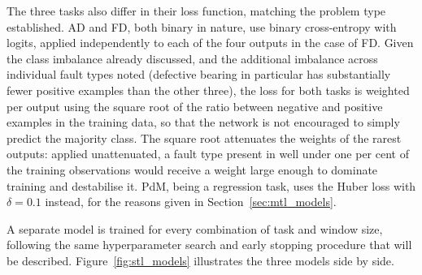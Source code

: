 The three tasks also differ in their loss function, matching the problem type established. AD and FD,
both binary in nature, use binary cross-entropy with logits, applied independently to each of the four
outputs in the case of FD. Given the class imbalance already discussed, and the additional imbalance
across individual fault types noted (defective bearing in particular has substantially fewer positive
examples than the other three), the loss for both tasks is weighted per output using the square root of
the ratio between negative and positive examples in the training data, so that the network is not
encouraged to simply predict the majority class. The square root attenuates the weights of the rarest
outputs: applied unattenuated, a fault type present in well under one per cent of the training
observations would receive a weight large enough to dominate training and destabilise it. PdM, being a
regression task, uses the Huber loss with $\delta = 0.1$ instead, for the reasons given in
Section~\ref{sec:mtl_models}.

A separate model is trained for every combination of task and window size, following the same hyperparameter 
search and early stopping procedure that will be described. Figure~\ref{fig:stl_models} illustrates the three models side by side.

